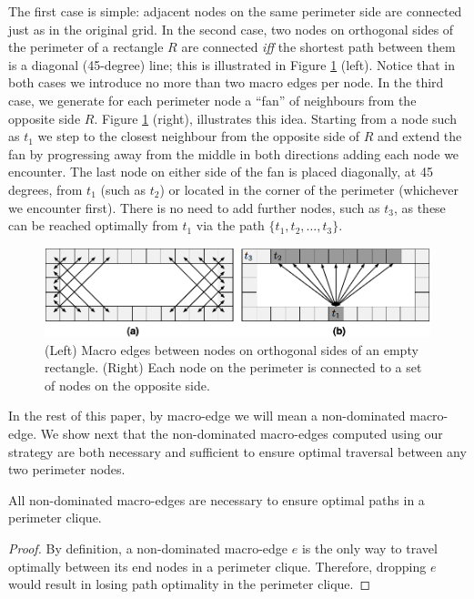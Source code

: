 The first case is simple: adjacent nodes on the same perimeter side are connected
just as in the original grid. 
In the second case, two nodes on orthogonal sides of the perimeter of a rectangle
$R$ are connected \emph{iff} the shortest path between them is a diagonal
(45-degree) line; this is illustrated in Figure \ref{fig::rsr::macroedges} (left).
Notice that in both cases we introduce no more than two macro edges per node.
In the third case, we generate for each perimeter node a ``fan'' of neighbours
from the opposite side $R$.  Figure \ref{fig::rsr::macroedges} (right), illustrates
this idea.  Starting from a node such as $t_{1}$ we step to the closest
neighbour from the opposite side of $R$ and extend the fan by progressing away
from the middle in both directions adding each node we encounter.  The last node
on either side of the fan is placed diagonally, at 45 degrees, from $t_{1}$
(such as $t_{2}$) or located in the corner of the perimeter (whichever we
encounter first).  There is no need to add further nodes, such as $t_{3}$, as
these can be reached optimally from $t_1$ via the path $\lbrace t_1, t_2, \dots,
t_3\rbrace$.

\begin{figure}[tb]
       \begin{center}
		   \includegraphics[width=0.95\columnwidth, trim = 10mm 10mm 10mm 0mm]
			{chapter_rsr/diagrams/macroedges_wide.png}
       \end{center}
	\vspace{-3pt}
       \caption{(Left) Macro edges between nodes on orthogonal sides of an empty
       rectangle. (Right) Each node on the perimeter is connected to a set of 
		nodes on the opposite side.}
       \label{fig::rsr::macroedges}
\end{figure}

In the rest of this paper, by macro-edge we will mean a non-dominated macro-edge.
We show next that the non-dominated macro-edges computed using our strategy are both
necessary and sufficient to ensure optimal traversal between any two perimeter
nodes.

\begin{proposition} All non-dominated macro-edges are necessary to ensure
optimal paths in a perimeter clique.  
\end{proposition} 
\begin{proof} By
definition, a non-dominated macro-edge $e$ is the only way to travel optimally
between its end nodes in a perimeter clique. Therefore, dropping $e$ would
result in losing path optimality in the perimeter clique.  
\end{proof}

